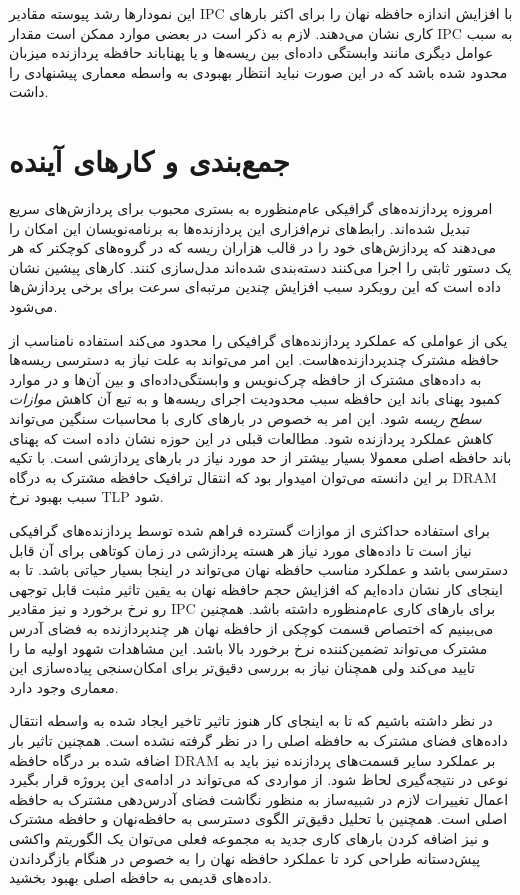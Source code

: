 \documentclass{thesis}
\begin{document}
این نمودار‌ها رشد پیوسته مقادیر 
IPC
با افزایش اندازه حافظه نهان را برای اکثر بارهای کاری نشان می‌دهند.
لازم به ذکر است در بعضی موارد ممکن است مقدار
IPC
به سبب عوامل دیگری مانند وابستگی داده‌ای بین ریسه‌ها و یا پهنا‌باند حافظه پردازنده میزبان محدود شده باشد که در این صورت نباید انتظار بهبودی به واسطه معماری پیشنهادی را داشت.

\chapter{
جمع‌بندی و کار‌های آینده
}

امروزه پردازنده‌های گرافیکی عام‌منظوره به بستری محبوب برای پردازش‌های سریع تبدیل شده‌اند. رابط‌های نرم‌افزاری این پردازنده‌ها به برنامه‌نویسان این امکان را می‌دهند که پردازش‌های خود را در قالب هزاران ریسه که در گروه‌های کوچکتر که هر یک دستور ثابتی را اجرا می‌کنند دسته‌بندی‌ شده‌اند مدل‌سازی کنند. کارهای پیشین نشان داده‌ است که این رویکرد سبب افزایش چندین مرتبه‌ای سرعت برای برخی پردازش‌ها می‌شود.

یکی از عواملی که عملکرد پردازنده‌های گرافیکی را محدود می‌کند استفاده نامناسب
از حافظه مشترک چند‌پردازنده‌هاست. این امر می‌تواند به علت نیاز به دسترسی ریسه‌ها به داده‌های مشترک از حافظه چرک‌نویس و وابستگی‌داده‌ای و بین‌ آن‌ها و در موارد کمبود پهنای باند این حافظه سبب محدودیت اجرای ریسه‌ها و به تبع آن کاهش
\textit{
موازات سطح ریسه
}
شود. این امر به خصوص در بارهای کاری با محاسبات سنگین می‌تواند کاهش عملکرد پردازنده شود. مطالعات قبلی در این حوزه نشان داده است که پهنای باند حافظه اصلی معمولا بسیار بیشتر از حد مورد نیاز در بارهای پردازشی است. با تکیه بر این دانسته می‌توان امیدوار بود که انتقال ترافیک حافظه مشترک به درگاه
DRAM
سبب بهبود نرخ
TLP
شود.

برای استفاده حداکثری از موازات گسترده فراهم شده توسط پردازنده‌های گرافیکی نیاز است تا داده‌های مورد نیاز هر هسته پردازشی در زمان کوتاهی برای آن قابل دسترسی باشد و  عملکرد مناسب حافظه نهان می‌تواند در اینجا بسیار حیاتی باشد.
تا به اینجای کار نشان داده‌ایم که افزایش حجم حافظه نهان به یقین تاثیر مثبت قابل توجهی رو نرخ برخورد و نیز مقادیر
IPC
برای بارهای کاری عام‌منظوره داشته باشد. همچنین می‌بینیم که اختصاص قسمت کوچکی از حافظه نهان هر چندپردازنده به فضای آدرس مشترک می‌تواند تضمین‌کننده نرخ برخورد بالا باشد. این مشاهدات شهود اولیه ما را تایید می‌کند ولی همچنان نیاز به 
بررسی دقیق‌تر برای امکان‌سنجی پیاده‌سازی این معماری وجود دارد.

در نظر داشته باشیم که تا به اینجای کار هنوز تاثیر تاخیر ایجاد شده به واسطه انتقال داده‌های فضای مشترک به حافظه اصلی را در نظر گرفته نشده است. همچنین تاثیر بار اضافه شده بر درگاه حافظه
DRAM
بر عملکرد سایر قسمت‌های پردازنده نیز باید به نوعی در نتیجه‌گیری لحاظ شود. از مواردی که می‌تواند در ادامه‌ی این پروژه قرار بگیرد اعمال تغییرات لازم در شبیه‌ساز به منظور نگاشت فضای آدرس‌دهی مشترک به حافظه اصلی است. همچنین با تحلیل دقیق‌تر الگوی دسترسی به حافظه‌نهان و حافظه مشترک و نیز اضافه کردن بارهای کاری جدید به مجموعه فعلی می‌توان یک الگوریتم واکشی ‌پیش‌دستانه
طراحی کرد تا عملکرد حافظه نهان را به خصوص در هنگام بازگرداندن داده‌های قدیمی به حافظه اصلی بهبود بخشید.
\end{document}
